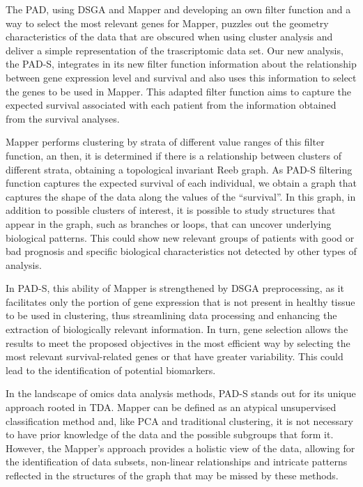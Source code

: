 The PAD, using DSGA and Mapper and developing an own filter function and a way to select the most relevant genes for Mapper, puzzles out the geometry characteristics of the data that are obscured when using cluster analysis and deliver a simple representation of the trascriptomic data set. Our new analysis, the PAD-S, integrates in its new filter function information about the relationship between gene expression level and survival and also uses this information to select the genes to be used in Mapper. This adapted filter function aims to capture the expected survival associated with each patient from the information obtained from the survival analyses.

Mapper performs clustering by strata of different value ranges of this filter function, an then, it is determined if there is a relationship between clusters of different strata, obtaining a topological invariant Reeb graph. As PAD-S filtering function captures the expected survival of each individual, we obtain a graph that captures the shape of the data along the values of the ``survival''. In this graph, in addition to possible clusters of interest, it is possible to study structures that appear in the graph, such as branches or loops, that can uncover underlying biological patterns. This could show new relevant groups of patients with good or bad prognosis and specific biological characteristics not detected by other types of analysis.

In PAD-S, this ability of Mapper is strengthened by DSGA preprocessing, as it facilitates only the portion of gene expression that is not present in healthy tissue to be used in clustering, thus streamlining data processing and enhancing the extraction of biologically relevant information. In turn, gene selection allows the results to meet the proposed objectives in the most efficient way by selecting the most relevant survival-related genes or that have greater variability. This could lead to the identification of potential biomarkers.

In the landscape of omics data analysis methods, PAD-S stands out for its unique approach rooted in TDA. Mapper can be defined as an atypical unsupervised classification method and, like PCA and traditional clustering, it is not necessary to have prior knowledge of the data and the possible subgroups that form it. However, the Mapper's approach provides a holistic view of the data, allowing for the identification of data subsets, non-linear relationships and intricate patterns reflected in the structures of the graph that may be missed by these methods.

